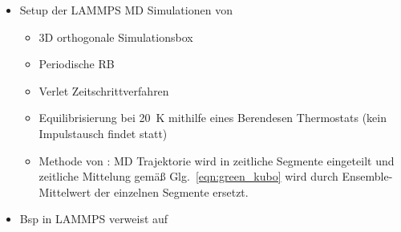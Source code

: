 \documentclass[a4paper, 10pt, 
               numbers=noenddot, toc=graduated,
               headsepline=true, footsepline=true,
               twoside=false, titlepage=true, 
               bibliography=totoc]{scrartcl}
\newcommand{\refeqn}[1]  {Glg.~\ref{#1}}
\begin{document}
\begin{itemize}
    		 \item Setup der LAMMPS MD Simulationen von \cite{Kirova2015,Tenney2010} 
		 		\begin{itemize}
		 			\item 3D orthogonale Simulationsbox
		 			\item Periodische RB
		 			\item Verlet Zeitschrittverfahren
		 			\item Equilibrisierung bei \SI{20}{K} mithilfe eines Berendesen Thermostats (kein Impulstausch findet statt)
		 			\item Methode von \cite{Kirova2015}: MD Trajektorie wird in zeitliche Segmente eingeteilt und zeitliche Mittelung gemäß \refeqn{eqn:green_kubo} wird durch Ensemble-Mittelwert der einzelnen Segmente ersetzt.
		 		\end{itemize}
			 	
		 	\item Bsp in LAMMPS verweist auf \cite{Daivis1994}
		\end{itemize}
\end{document}
